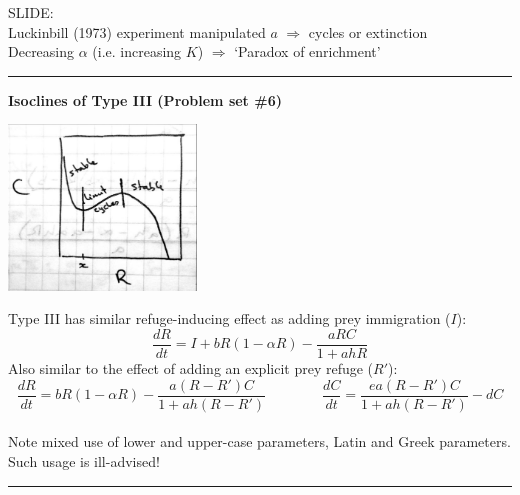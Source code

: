 \documentclass{article}
\newcommand{\note}[1]{\colorbox{gray!30}{#1}}
\newcommand{\ind}{\-\hspace{1cm}}
\begin{document}
\note{SLIDE:}\\
\ind Luckinbill (1973) experiment manipulated $a$ $\Rightarrow$ cycles or extinction\\
\ind Decreasing $\alpha$ (i.e. increasing $K$) $\Rightarrow$ `Paradox of enrichment'

\rule[0.5ex]{\linewidth}{1pt}

\textbf{Isoclines of Type III (Problem set \#6)}\\
\begin{center}
\includegraphics[width=5cm]{figs/MRiso3.pdf}
\end{center}

Type III has similar refuge-inducing effect as adding prey immigration ($I$):
\begin{equation*}
	\frac{dR}{dt}=I+bR(1-\alpha R) - \frac{aRC}{1+ahR}
\end{equation*}
Also similar to the effect of adding an explicit prey refuge ($R'$):
\begin{equation*}
	\frac{dR}{dt}=bR(1-\alpha R) - \frac{a(R-R')C}{1+ah(R-R')} \qquad \qquad \frac{dC}{dt}=\frac{ea(R-R')C}{1+ah(R-R')} - dC
\end{equation*}
\\
Note mixed use of lower and upper-case parameters, Latin and Greek parameters.\\
\ind Such usage is ill-advised!


\rule[0.5ex]{\linewidth}{1pt}
\end{document}
